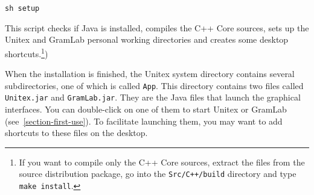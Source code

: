 \verb+sh setup+

\noindent This script checks if Java is installed, compiles the C++ Core sources, sets up the
Unitex and GramLab personal working directories and creates some desktop shortcuts.\footnote{If
you want to compile only the C++ Core sources, extract the files from the source distribution package,
go into the {\tt Src/C++/build} directory and type {\tt make install}.})

\bigskip
\noindent When the installation is finished, the Unitex system directory contains several
subdirectories,  one  of which is called \verb+App+. This directory contains two
files called \verb+Unitex.jar+ and \verb+GramLab.jar+. They
are the Java files that launch the graphical interfaces. You can double-click on one of them
to start Unitex or GramLab (see~\ref{section-first-use}). To facilitate launching them,
you may want to add shortcuts to these files on the desktop.





 





